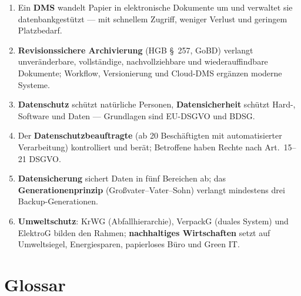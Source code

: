 \documentclass[11pt, a4paper]{article}
\begin{document}
\begin{enumerate}
  \item Ein \textbf{DMS} wandelt Papier in elektronische Dokumente um und verwaltet sie datenbankgestützt --- mit schnellem Zugriff, weniger Verlust und geringem Platzbedarf.
  \item \textbf{Revisionssichere Archivierung} (HGB \S~257, GoBD) verlangt unveränderbare, vollständige, nachvollziehbare und wiederauffindbare Dokumente; Workflow, Versionierung und Cloud-DMS ergänzen moderne Systeme.
  \item \textbf{Datenschutz} schützt natürliche Personen, \textbf{Datensicherheit} schützt Hard-, Software und Daten --- Grundlagen sind EU-DSGVO und BDSG.
  \item Der \textbf{Datenschutzbeauftragte} (ab 20 Beschäftigten mit automatisierter Verarbeitung) kontrolliert und berät; Betroffene haben Rechte nach Art.~15--21 DSGVO.
  \item \textbf{Datensicherung} sichert Daten in fünf Bereichen ab; das \textbf{Generationenprinzip} (Großvater--Vater--Sohn) verlangt mindestens drei Backup-Generationen.
  \item \textbf{Umweltschutz}: KrWG (Abfallhierarchie), VerpackG (duales System) und ElektroG bilden den Rahmen; \textbf{nachhaltiges Wirtschaften} setzt auf Umweltsiegel, Energiesparen, papierloses Büro und Green IT.
\end{enumerate}

\newpage

\section*{Glossar}




\end{document}

